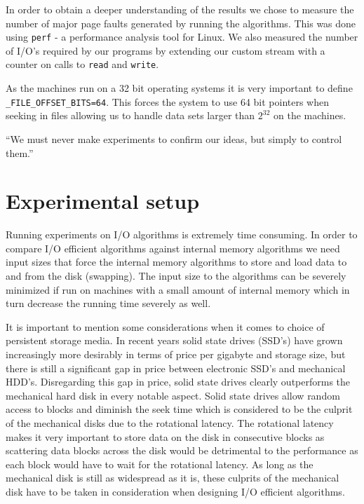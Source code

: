 \documentclass[twoside,11pt,openright]{report}
\begin{document}
In order to obtain a deeper understanding of the results we chose to measure the number of major page faults generated by running the algorithms. This was done using \texttt{perf} - a performance analysis tool for Linux. We also measured the number of I/O's required by our programs by extending our custom stream with a counter on calls to \texttt{read} and \texttt{write}.

As the machines run on a 32 bit operating systems it is very important to define \texttt{\_FILE\_OFFSET\_BITS=64}. This forces the system to use 64 bit pointers when seeking in files allowing us to handle data sets larger than $2^{32}$ on the machines.

\begin{savequote}[0.55\textwidth]
``We must never make experiments to confirm our ideas, but simply to control them.''
\end{savequote}
\chapter{Experimental setup}
\label{chp:experimental_setup}
Running experiments on I/O algorithms is extremely time consuming. In order to compare I/O efficient algorithms against internal memory algorithms we need input sizes that force the internal memory algorithms to store and load data to and from the disk (swapping). The input size to the algorithms can be severely minimized if run on machines with a small amount of internal memory which in turn decrease the running time severely as well.

It is important to mention some considerations when it comes to choice of persistent storage media. In recent years solid state drives (SSD's) have grown increasingly more desirably in terms of price per gigabyte and storage size, but there is still a significant gap in price between electronic SSD's and mechanical HDD's. Disregarding this gap in price, solid state drives clearly outperforms the mechanical hard disk in every notable aspect. Solid state drives allow random access to blocks and diminish the seek time which is considered to be the culprit of the mechanical disks due to the rotational latency.
The rotational latency makes it very important to store data on the disk in consecutive blocks as scattering data blocks across the disk would be detrimental to the performance as each block would have to wait for the rotational latency. As long as the mechanical disk is still as widespread as it is, these culprits of the mechanical disk have to be taken in consideration when designing I/O efficient algorithms.
\end{document}
